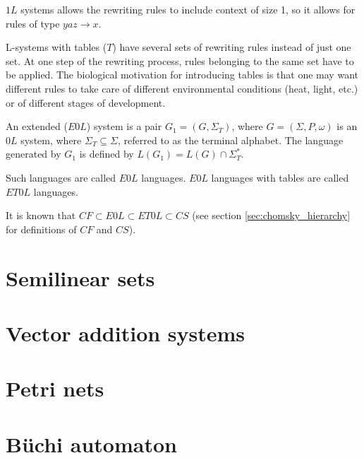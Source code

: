 $1L$ systems allows the rewriting rules to include context of size 1, so it allows for rules of type $yaz\rightarrow x$.

L-systems with tables ($T$) have several sets of rewriting rules instead of just one set. At one step of the rewriting process, rules belonging to the same set have to be applied. The biological motivation for introducing tables is that one may want different rules to take care of different environmental conditions (heat, light, etc.) or of different stages of development.

\begin{definition}
An extended ($E0L$) system is a pair $G_1 = (G, \Sigma_T)$, where $G = (\Sigma, P, \omega)$ is an $0L$ system, where $\Sigma_T \subseteq \Sigma$, referred to as the terminal alphabet. The language generated by $G_1$ is defined by $L(G_1) = L(G)\cap \Sigma_T^*$.
\end{definition}

Such languages are called $E0L$ languages. $E0L$ languages with tables are called $ET0L$ languages.

It is known that $CF \subset E0L \subset ET0L \subset CS$ (see section \ref{sec:chomsky_hierarchy} for definitions of $CF$ and $CS$).

\section{Semilinear sets} %
\label{sec:semilinear_sets}


\section{Vector addition systems} %
\label{sec:vector_addition_systems}


\section{Petri nets} %
\label{sec:petri_nets}


\section{Büchi automaton} %
\label{sec:buchi_automaton}

